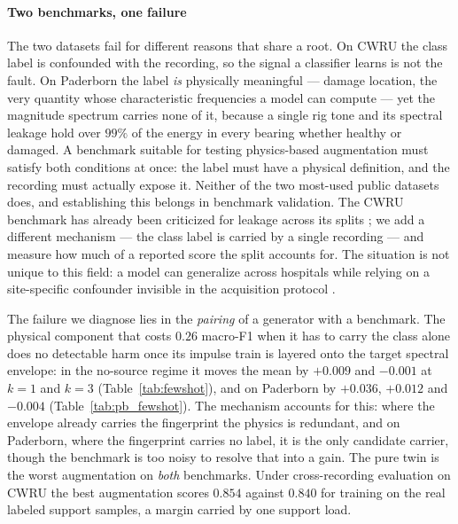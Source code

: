 \documentclass[preprint,12pt]{elsarticle}
\begin{document}
\paragraph{Two benchmarks, one failure} The two datasets fail for different
reasons that share a root.
On CWRU the class label is confounded with the recording, so the signal a
classifier learns is not the fault. On Paderborn the label \emph{is} physically
meaningful --- damage location, the very quantity whose characteristic
frequencies a model can compute --- yet the magnitude spectrum carries none of
it, because a single rig tone and its spectral leakage hold over $99\%$ of the
energy in every bearing whether healthy or damaged. A benchmark suitable for testing
physics-based augmentation must satisfy both conditions at once: the label must
have a physical definition, and the recording must actually expose it. Neither
of the two most-used public datasets does, and establishing this belongs in
benchmark validation. The CWRU benchmark has already been criticized for leakage across its
splits \cite{hendriks2022benchmark}; we add a different mechanism --- the
class label is carried by a single recording --- and measure how much of a
reported score the split accounts for. The situation is not unique to this field: a model can generalize
across hospitals while relying on a site-specific confounder invisible in the
acquisition protocol \cite{zech2018variable}.

The failure we diagnose lies in the \emph{pairing} of a generator with a
benchmark. The physical component that costs $0.26$
macro-F1 when it has to carry the class alone does no detectable harm once its
impulse train is layered onto the target spectral envelope: in the no-source
regime it moves the mean by $+0.009$ and $-0.001$ at $k=1$ and $k=3$
(Table~\ref{tab:fewshot}), and on Paderborn by $+0.036$, $+0.012$ and $-0.004$
(Table~\ref{tab:pb_fewshot}). The mechanism accounts for this: where the envelope
already carries the fingerprint the physics is redundant, and on Paderborn,
where the fingerprint carries no label, it is the only candidate carrier, though
the benchmark is too noisy to resolve that into a gain. The pure twin is the
worst augmentation on \emph{both} benchmarks. Under cross-recording evaluation
on CWRU the best augmentation scores $0.854$ against $0.840$ for training on the
real labeled support samples, a margin carried by one support load.
\end{document}

